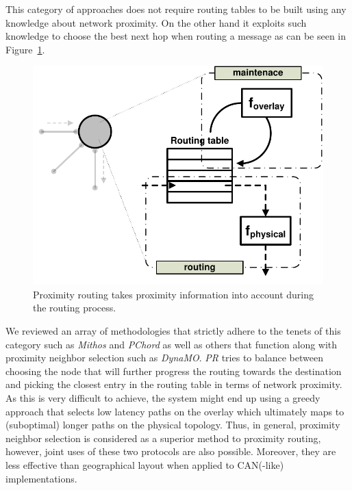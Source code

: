 This category of approaches %
does not require routing tables to be built using any
knowledge about network proximity. 
On the other hand it exploits such knowledge
to choose the best next hop when routing a message as can be seen in
Figure~\ref{figure:proximity-routing}. 
\begin{figure}[ht]
\centering
  \includegraphics[scale=0.4]{img/pdf/proximity-routing.pdf}
\caption{Proximity routing takes proximity information into account during the
routing process.}
\label{figure:proximity-routing}
\end{figure}
We reviewed an array of methodologies that strictly adhere to 
the tenets of this category such as \emph{Mithos} and
\emph{PChord} as well as others that function along with 
proximity neighbor selection such as \emph{DynaMO}.
\emph{PR} tries to balance between choosing the node that will
further progress the routing towards the destination 
and picking the closest entry in the routing table
in terms of network proximity. 
As this is very difficult to achieve,  %
the system might end up
using a greedy approach that selects low latency paths on the overlay
which ultimately maps to (suboptimal) longer paths on the physical topology. 
Thus, in general, proximity neighbor selection is considered 
as a superior method to proximity routing, however, joint uses of these two protocols are also possible. 
Moreover, they are  %
less effective than geographical layout when applied to CAN(-like)
implementations.


